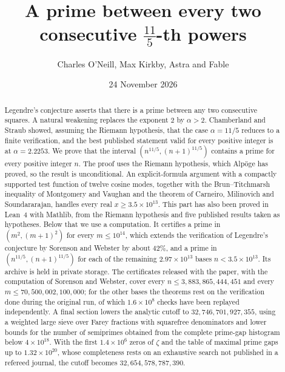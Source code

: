 \documentclass[11pt,colorlinks]{charlie}
\title{A prime between every two consecutive $\tfrac{11}{5}$-th powers}
\author{Charles O'Neill, Max Kirkby, Astra and Fable}
\date{24 November 2026}
\begin{document}
\maketitle

\begin{abstract}
Legendre's conjecture asserts that there is a prime between any two consecutive squares. A natural weakening replaces the exponent $2$ by $\alpha>2$. Chamberland and Straub showed, assuming the Riemann hypothesis, that the case $\alpha=11/5$ reduces to a finite verification, and the best published statement valid for every positive integer is at $\alpha=2.2253$. We prove that the interval $(n^{11/5},(n+1)^{11/5})$ contains a prime for every positive integer $n$. The proof uses the Riemann hypothesis, which Alp\"oge has proved, so the result is unconditional. An explicit-formula argument with a compactly supported test function of twelve cosine modes, together with the Brun--Titchmarsh inequality of Montgomery and Vaughan and the theorem of Carneiro, Milinovich and Soundararajan, handles every real $x\ge3.5\times10^{13}$. This part has also been proved in Lean~4 with Mathlib, from the Riemann hypothesis and five published results taken as hypotheses. Below that we use a computation. It certifies a prime in $(m^2,(m+1)^2)$ for every $m\le10^{14}$, which extends the verification of Legendre's conjecture by Sorenson and Webster by about $42\%$, and a prime in $(n^{11/5},(n+1)^{11/5})$ for each of the remaining $2.97\times10^{13}$ bases $n<3.5\times10^{13}$. Its archive is held in private storage. The certificates released with the paper, with the computation of Sorenson and Webster, cover every $n\le3{,}883{,}865{,}444{,}451$ and every $m\le70{,}500{,}002{,}100{,}000$; for the other bases the theorems rest on the verification done during the original run, of which $1.6\times10^8$ checks have been replayed independently. A final section lowers the analytic cutoff to $32{,}746{,}701{,}927{,}355$, using a weighted large sieve over Farey fractions with squarefree denominators and lower bounds for the number of semiprimes obtained from the complete prime-gap histogram below $4\times10^{18}$. With the first $1.4\times10^6$ zeros of $\zeta$ and the table of maximal prime gaps up to $1.32\times10^{20}$, whose completeness rests on an exhaustive search not published in a refereed journal, the cutoff becomes $32{,}654{,}578{,}787{,}390$.
\end{abstract}
\end{document}

